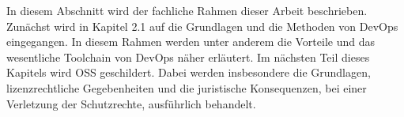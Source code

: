 In diesem Abschnitt wird der fachliche Rahmen dieser Arbeit beschrieben. Zunächst wird in Kapitel 2.1 auf die Grundlagen und die Methoden von DevOps eingegangen. In diesem Rahmen werden unter anderem die Vorteile und das wesentliche Toolchain von DevOps näher erläutert. Im nächsten Teil dieses Kapitels wird OSS geschildert. Dabei werden insbesondere die Grundlagen, lizenzrechtliche Gegebenheiten und die juristische Konsequenzen, bei einer Verletzung der Schutzrechte, ausführlich behandelt.